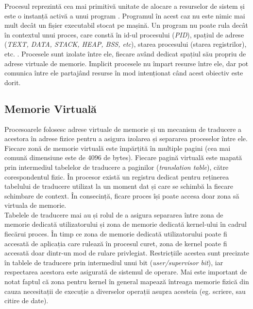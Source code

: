 Procesul reprezintă cea mai primitivă unitate de alocare a resurselor de sistem
și este o instanță activă a unui program \cite{processes}. Programul în acest
caz nu este nimic mai mult decât un fișier executabil stocat pe mașină. Un
program nu poate rula decât în contextul unui proces, care constă în id-ul
procesului (\emph{PID}), spațiul de adrese (\emph{TEXT, DATA, STACK, HEAP, BSS,
etc}), starea procesului (starea registrilor), etc. \cite{exception_processes}.
Procesele sunt izolate între ele, fiecare având dedicat spațiul său propriu de
adrese virtuale de memorie. Implicit procesele nu împart resurse între ele, dar
pot comunica între ele partajând resurse în mod intenționat când acest obiectiv
este dorit.

\subsection{Memorie Virtuală}
\label{sec:virtual_memory}

Procesoarele folosesc adrese virtuale de memorie și un mecanism de traducere a
acestora în adrese fizice pentru a asigura izolarea și separarea proceselor
între ele. Fiecare zonă de memorie virtuală este împărțită în multiple pagini
(cea mai comună dimensiune este de 4096 de bytes). Fiecare pagină virtuală este
mapată prin intermediul tabelelor de traducere a paginilor (\emph{translation
table}), către corespondentul fizic. În procesor există un registru dedicat pentru 
reținerea tabelului de traducere utilizat la un moment dat și care se schimbă la 
fiecare schimbare de context. În consecință, ficare proces își poate accesa doar 
zona să virtuala de memorie. \\

Tabelele de traducere mai au și rolul de a asigura separarea între zona de
memorie dedicată utilizatorului și zona de memorie dedicată kernel-ului în
cadrul fiecărui proces. În timp ce zona de memorie dedicată utilizatorului poate
fi accesată de aplicația care rulează în procesul curet, zona de kernel poate
fi accesată doar dintr-un mod de rulare privlegiat. Restricțiile
acestea sunt precizate în tablele de traducere prin intermediul unui bit
(\emph{user/supervisor bit}), iar respectarea acestora este asigurată de
sistemul de operare. Mai este important de notat faptul că zona pentru kernel
în general mapează întreaga memorie fizică din cauza necesitații de execuție a
diverselor operații asupra acesteia (eg. scriere, sau citire de date).\\

